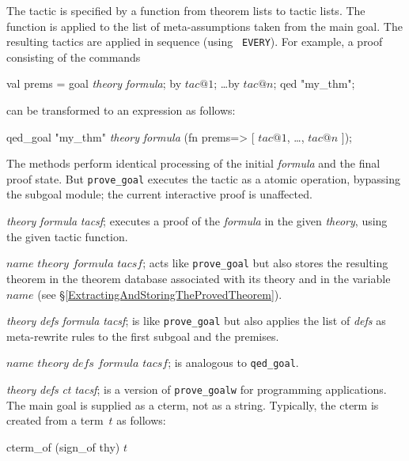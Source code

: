 The tactic is specified by a function from theorem lists to tactic lists.
The function is applied to the list of meta-assumptions taken from
the main goal.  The resulting tactics are applied in sequence (using {\tt
  EVERY}).  For example, a proof consisting of the commands
\begin{ttbox} 
val prems = goal {\it theory} {\it formula};
by \(tac@1\);  \ldots  by \(tac@n\);
qed "my_thm";
\end{ttbox}
can be transformed to an expression as follows:
\begin{ttbox} 
qed_goal "my_thm" {\it theory} {\it formula}
 (fn prems=> [ \(tac@1\), \ldots, \(tac@n\) ]);
\end{ttbox}
The methods perform identical processing of the initial {\it formula} and
the final proof state.  But {\tt prove_goal} executes the tactic as a
atomic operation, bypassing the subgoal module; the current interactive
proof is unaffected.
%
\begin{ttdescription}
\item[\ttindexbold{prove_goal} {\it theory} {\it formula} {\it tacsf};] 
executes a proof of the {\it formula\/} in the given {\it theory}, using
the given tactic function.

\item[\ttindexbold{qed_goal} $name$ $theory$ $formula$ $tacsf$;] acts
  like {\tt prove_goal} but also stores the resulting theorem in the
  theorem database associated with its theory and in the {\ML}
  variable $name$ (see \S\ref{ExtractingAndStoringTheProvedTheorem}).

\item[\ttindexbold{prove_goalw} {\it theory} {\it defs} {\it formula} 
      {\it tacsf};]
is like {\tt prove_goal} but also applies the list of {\it defs\/} as
meta-rewrite rules to the first subgoal and the premises.

\item[\ttindexbold{qed_goalw} $name$ $theory$ $defs$ $formula$ $tacsf$;]
is analogous to {\tt qed_goal}.

\item[\ttindexbold{prove_goalw_cterm} {\it theory} {\it defs} {\it ct}
      {\it tacsf};] 
is a version of {\tt prove_goalw} for programming applications.  The main
goal is supplied as a cterm, not as a string.  Typically, the cterm is
created from a term~$t$ as follows:
\begin{ttbox}
cterm_of (sign_of thy) \(t\)
\end{ttbox}
\end{ttdescription}


